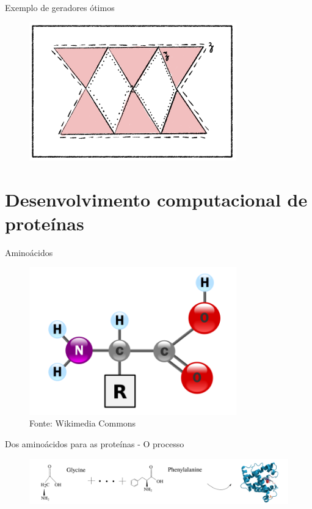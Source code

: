 \documentclass[10pt]{beamer}
\begin{document}
\begin{frame}{Exemplo de geradores ótimos}
    \begin{figure}
        \centering
        \includegraphics[width=0.8\textwidth]{../images/nonoptcyc.png}
    \end{figure}
\end{frame}

\section{Desenvolvimento computacional de proteínas}

\begin{frame}{Aminoácidos}
    \begin{figure}
        \centering
        \includegraphics[width=0.8\textwidth]{images/aminoacid.png}
        \caption*{Fonte: Wikimedia Commons}
    \end{figure}  
\end{frame}

\begin{frame}{Dos aminoácidos para as proteínas - O processo}
    \begin{figure}
        \centering
        \includegraphics[width=1.0\textwidth]{images/aminoplusprotein.pdf}
    \end{figure} 
\end{frame}
\end{document}
